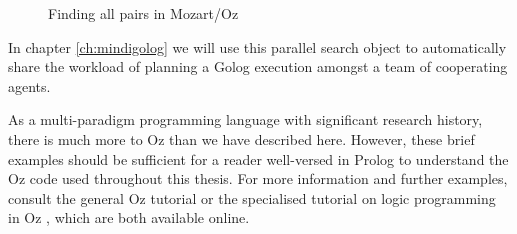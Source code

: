 %
\begin{figure}[t]

\caption{Finding all pairs in Mozart/Oz\label{fig:Background:Parallel-All-Pairs}}

\end{figure}


In chapter \ref{ch:mindigolog} we will use this parallel search object
to automatically share the workload of planning a Golog execution
amongst a team of cooperating agents.

As a multi-paradigm programming language with significant research
history, there is much more to Oz than we have described here. However,
these brief examples should be sufficient for a reader well-versed
in Prolog to understand the Oz code used throughout this thesis. For
more information and further examples, consult the general Oz tutorial
\citep{haridi99oz_tutorial} or the specialised tutorial on logic
programming in Oz \citep{lpinoz99}, which are both available online.

